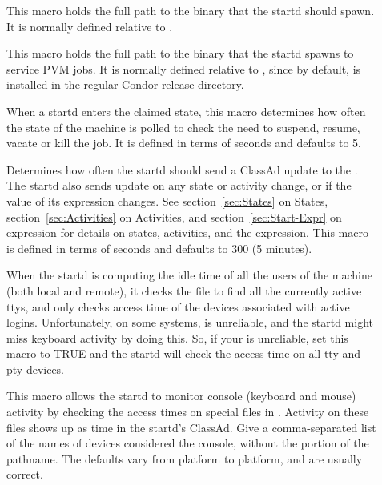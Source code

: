 \begin{description}

\item[] \label{param:Starter}  This macro holds the
  full path to the  binary that the startd should 
  spawn.
  It is normally defined relative to .
  
\item[] \label{param:AlternateStarter1}
  This macro holds the full path to the 
  binary that the startd spawns to service PVM jobs.  It is normally
  defined relative to , since by default,
   is installed in the regular Condor release
  directory. 
  
\item[] \label{param:PollingInterval} When a
  startd enters the claimed state, this macro determines how often
  the state of the machine is polled to check the need to suspend, resume,
  vacate or kill the job.  It is defined in terms of seconds and defaults to
  5.
  
\item[] \label{param:UpdateInterval}
  Determines how often the startd should send a ClassAd update
  to the .  The startd also sends update on any
  state or activity change, or if the value of its  expression
  changes.  See section~\ref{sec:States} on 
  States, section~\ref{sec:Activities} on 
  Activities, and section~\ref{sec:Start-Expr} on 
   expression for details on states, activities, and the
   expression.  This macro is defined in
  terms of seconds and defaults to 300 (5 minutes).
  
\item[] \label{param:StartdHasBadUtmp}
  When the startd is computing the idle time of all the
  users of the machine (both local and remote), it checks the
   file to find all the currently active ttys, and only
  checks access time of the devices associated with active logins.
  Unfortunately, on some systems,  is unreliable, and the
  startd might miss keyboard activity by doing this.  So, if your
   is unreliable, set this macro to TRUE and the
  startd will check the access time on all tty and pty devices.
  
\item[] \label{param:ConsoleDevices} This
  macro allows the startd to monitor console (keyboard and mouse)
  activity by checking the access times on special files in
  .  Activity on these files shows up as 
  time in the startd's ClassAd.  Give a comma-separated list of
  the names of devices considered the console, without the
   portion of the pathname.  The defaults vary from
  platform to platform, and are usually correct.  


\end{description}
